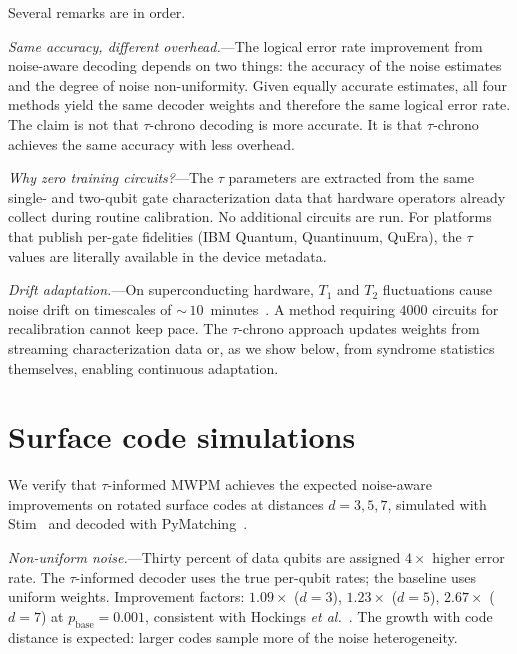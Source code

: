 \documentclass[prl,twocolumn,superscriptaddress,longbibliography]{revtex4-2}
\begin{document}
Several remarks are in order.

\emph{Same accuracy, different overhead.}---The logical error rate improvement from noise-aware decoding depends on two things: the accuracy of the noise estimates and the degree of noise non-uniformity. Given equally accurate estimates, all four methods yield the same decoder weights and therefore the same logical error rate. The claim is not that $\tau$-chrono decoding is more accurate. It is that $\tau$-chrono achieves the same accuracy with less overhead.

\emph{Why zero training circuits?}---The $\tau$ parameters are extracted from the same single- and two-qubit gate characterization data that hardware operators already collect during routine calibration. No additional circuits are run. For platforms that publish per-gate fidelities (IBM Quantum, Quantinuum, QuEra), the $\tau$ values are literally available in the device metadata.

\emph{Drift adaptation.}---On superconducting hardware, $T_1$ and $T_2$ fluctuations cause noise drift on timescales of ${\sim}\,10$~minutes~\cite{GoogleWillow2024}. A method requiring $4000$ circuits for recalibration cannot keep pace. The $\tau$-chrono approach updates weights from streaming characterization data or, as we show below, from syndrome statistics themselves, enabling continuous adaptation.

\section{Surface code simulations}

We verify that $\tau$-informed MWPM achieves the expected noise-aware improvements on rotated surface codes at distances $d = 3, 5, 7$, simulated with Stim~\cite{Gidney2021} and decoded with PyMatching~\cite{Higgott2023}.

\emph{Non-uniform noise.}---Thirty percent of data qubits are assigned $4\times$ higher error rate. The $\tau$-informed decoder uses the true per-qubit rates; the baseline uses uniform weights. Improvement factors: $1.09\times$ ($d{=}3$), $1.23\times$ ($d{=}5$), $2.67\times$ ($d{=}7$) at $p_{\text{base}} = 0.001$, consistent with Hockings \emph{et al.}~\cite{Hockings2025}. The growth with code distance is expected: larger codes sample more of the noise heterogeneity.
\end{document}
